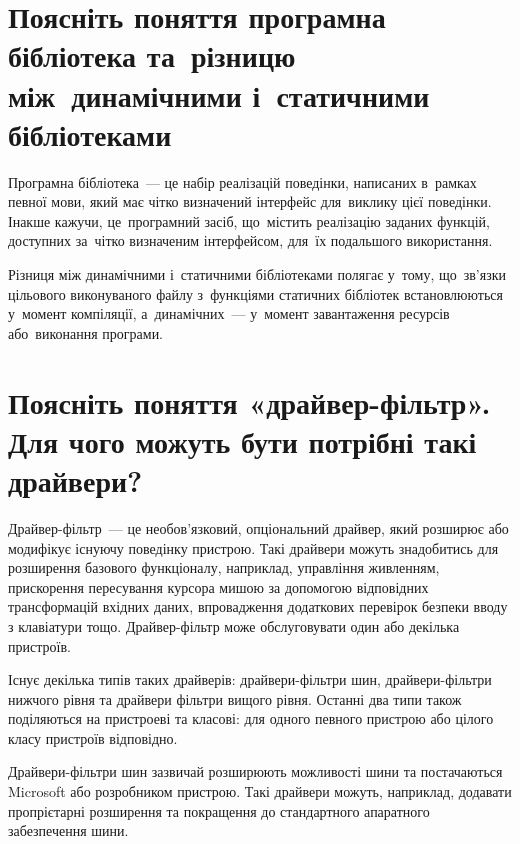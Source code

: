 \documentclass[
	a4paper,
	oneside,
	BCOR = 10mm,
	DIV = 12,
	12pt,
	headings = normal,
]{scrartcl}
\begin{document}
	\section{Поясніть поняття програмна бібліотека та~різницю між~динамічними і~статичними бібліотеками} 
		Програмна бібліотека~— це набір реалізацій поведінки, написаних в~рамках певної мови, який має чітко визначений інтерфейс для~виклику цієї поведінки. Інакше кажучи, це~програмний засіб, що~містить реалізацію заданих функцій, доступних за~чітко визначеним інтерфейсом, для~їх подальшого використання.

		Різниця між динамічними і~статичними бібліотеками полягає у~тому, що~зв'\-яз\-ки цільового виконуваного файлу з~функціями статичних бібліотек встановлюються у~момент компіляції, а~динамічних~— у~момент завантаження ресурсів або~виконання програми.

	\section{Поясніть поняття «драйвер-фільтр». Для чого можуть бути потрібні такі драйвери?} 
		Драйвер-фільтр~— це необов'язковий, опціональний драйвер, який розширює або модифікує існуючу поведінку пристрою. Такі драйвери можуть знадобитись для розширення базового функціоналу, наприклад, управління живленням, прискорення пересування курсора мишою за допомогою відповідних трансформацій вхідних даних, впровадження додаткових перевірок безпеки вводу з клавіатури тощо. Драйвер-фільтр може обслуговувати один або декілька пристроїв.

		Існує декілька типів таких драйверів: драйвери-фільтри шин, драйвери-фільтри нижчого рівня та драйвери фільтри вищого рівня. Останні два типи також поділяються на пристроеві та класові: для одного певного пристрою або цілого класу пристроїв відповідно.

		Драйвери-фільтри шин зазвичай розширюють можливості шини та постачаються Microsoft або розробником пристрою. Такі драйвери можуть, наприклад, додавати пропрієтарні розширення та покращення до стандартного апаратного забезпечення шини.
\end{document}

